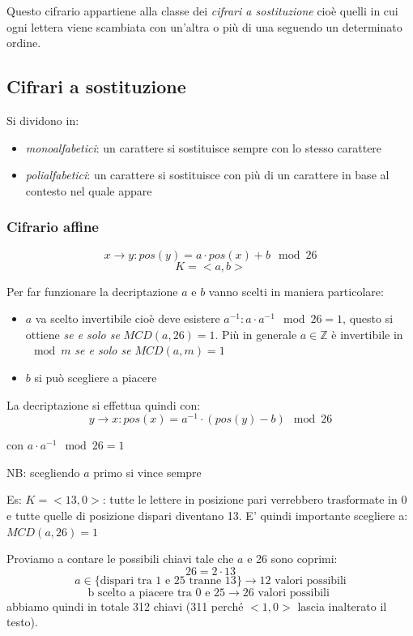 Questo cifrario appartiene alla classe dei \emph{cifrari a sostituzione} cioè quelli in cui ogni lettera viene scambiata con un'altra o più di una seguendo un determinato ordine.

\subsection{Cifrari a sostituzione}
Si dividono in:
\begin{itemize}
    \item \emph{monoalfabetici}: un carattere si sostituisce sempre con lo stesso carattere
    \item \emph{polialfabetici}: un carattere si sostituisce con più di un carattere in base al contesto nel quale appare
\end{itemize}

\subsubsection{Cifrario affine}
$$ x \xrightarrow{} y : pos\left(y\right) = a \cdot pos\left(x\right) + b \mod 26 $$
$$ K = <a, b> $$

Per far funzionare la decriptazione $a$ e $b$ vanno scelti in maniera particolare:
\begin{itemize}
    \item $a$ va scelto invertibile cioè deve esistere $a^{-1} : a \cdot a^{-1} \mod 26 = 1$, questo si ottiene \emph{se e solo se} $MCD(a, 26) = 1$. Più in generale $a \in \mathbb{Z}$ è invertibile in $\mod m$ \emph{se e solo se} $MCD(a, m)=1$
    \item $b$ si può scegliere a piacere
\end{itemize}

La decriptazione si effettua quindi con:
$$ y \xrightarrow{} x : pos\left(x\right) = a^{-1} \cdot (pos\left(y\right) - b) \mod 26 $$

con $a \cdot a^{-1} \mod 26 = 1$

NB: scegliendo $a$ primo si vince sempre

Es: $K = <13, 0>$: tutte le lettere in posizione pari verrebbero trasformate in 0 e tutte quelle di posizione dispari diventano 13. E' quindi importante scegliere a: $MCD(a, 26)=1$

Proviamo a contare le possibili chiavi tale che $a$ e 26 sono coprimi:
$$ 26 = 2 \cdot 13 $$
$$ a \in \{ \text{dispari tra 1 e 25 tranne 13} \} \xrightarrow{} 12 \text{ valori possibili} $$
$$ \text{b scelto a piacere tra 0 e 25} \xrightarrow{} 26 \text{ valori possibili } $$
abbiamo quindi in totale 312 chiavi (311 perché $<1,0>$ lascia inalterato il testo).

